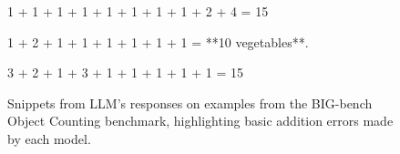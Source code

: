 \begin{figure}
\begin{tcolorbox}[colback=gray!6, colframe=gray!50, arc=2mm, boxrule=0.5pt, title={\textit{BIG-bench Object Counting}}, coltitle=black, colbacktitle=gray!20]
    \begin{tcolorbox}[custombox, title={Qwen 2.5 72B Instruct}]
    1 + 1 + 1 + 1 + 1 + 1 + 1 + 1 + 2 + 4 = 15
    \end{tcolorbox}
    \begin{tcolorbox}[custombox, title={Deepseek-V3}]
    1 + 2 + 1 + 1 + 1 + 1 + 1 + 1 = **10 vegetables**.
    \end{tcolorbox}
    \begin{tcolorbox}[custombox, title={Grok 2}]
    3 + 2 + 1 + 3 + 1 + 1 + 1 + 1 + 1 = 15
    \end{tcolorbox}
\end{tcolorbox}
    \caption{Snippets from LLM's responses on examples from the BIG-bench Object Counting benchmark, highlighting basic addition errors made by each model.}
    \label{appfig:object_counting}
\end{figure}

